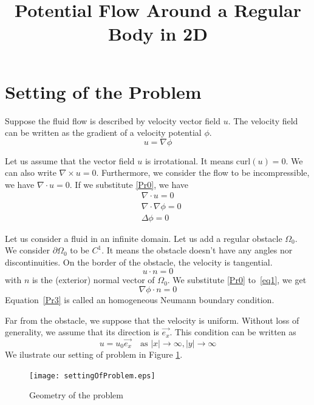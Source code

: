 \documentclass[a4paper,12pt]{article}
\title{Potential Flow Around a Regular Body in 2D}
\author{}
\date{}
\begin{document}
\maketitle
\section{Setting of the Problem}

Suppose the fluid flow is described by velocity vector field $u$. The velocity field can be written as the gradient 
of a velocity potential $\phi$. 
\begin{equation}\label{Pr0}
 u=\nabla \phi
\end{equation}

Let us assume that the vector field $u$ is irrotational. It means 
$\text{curl}(u)=0$. We can also write
$\nabla\times u=0$.
Furthermore, we consider the flow to be incompressible, we have $\nabla\cdot u=0$. If we substitute \eqref{Pr0}, we have
\begin{align}
&\nabla \cdot u=0 \\
 &\nabla \cdot \nabla\phi=0 \\
 &\Delta \phi=0 \label{Pr1}
\end{align}

Let us consider a fluid in an infinite domain. Let us add a regular obstacle $\Omega_0$. We consider $\partial\Omega_0$ to be $C^1$. It means the obstacle doesn't have any angles nor discontinuities. 
On the border of the obstacle, the velocity is tangential.
\begin{equation}\label{eq1}
u\cdot n=0
\end{equation}
with $n$ is the (exterior) normal vector of $\Omega_0$.
We substitute \eqref{Pr0} to~\eqref{eq1}, we get 
\begin{equation}\label{Pr3}
\nabla\phi\cdot n=0
\end{equation}
Equation~\eqref{Pr3} is called an homogeneous Neumann boundary condition.  

Far from the obstacle, we suppose that the velocity is uniform. Without loss of generality, 
we assume that its direction is $\vec{e_x}$. 
This condition can be written as
\begin{equation} \label{Pr2}
u=u_0\vec{e_x} \quad \text{as }|x|\to\infty, |y|\to\infty
\end{equation}
We ilustrate our setting of problem in Figure \ref{settingOfProblem}.
\begin{figure}[!htbp]
\begin{center}
\texttt{[image: settingOfProblem.eps]}
\end{center}
 \caption{Geometry of the problem}\label{settingOfProblem}
\end{figure}
\end{document}
